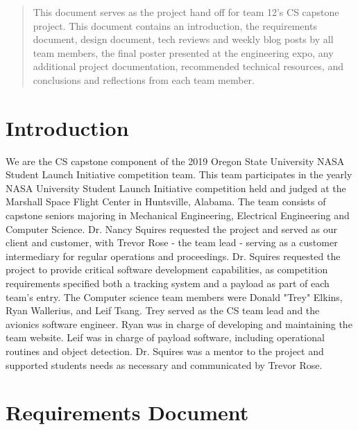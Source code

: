 \documentclass[onecolumn, draftclsnofoot, 10pt, compsoc]{IEEEtran}
\begin{document}
\begin{titlepage}
    \begin{abstract}
        This document serves as the project hand off for team 12's CS capstone project. This document contains an introduction, the requirements document, design document, tech reviews and weekly blog posts by all team members, the final poster presented at the engineering expo, any additional project documentation, recommended technical resources, and conclusions and reflections from each team member.
	\end{abstract}
\end{titlepage}
\newpage

\tableofcontents
\clearpage

\section{Introduction}
We are the CS capstone component of the 2019 Oregon State University NASA Student Launch Initiative competition team. This team participates in the yearly NASA University Student Launch Initiative competition held and judged at the Marshall Space Flight Center in Huntsville, Alabama. The team consists of capstone seniors majoring in Mechanical Engineering, Electrical Engineering and Computer Science. Dr. Nancy Squires requested the project and served as our client and customer, with Trevor Rose - the team lead - serving as a customer intermediary for regular operations and proceedings. Dr. Squires requested the project to provide critical software development capabilities, as competition requirements specified both a tracking system and a payload as part of each team's entry. The Computer science team members were Donald "Trey" Elkins, Ryan Wallerius, and Leif Tsang. Trey served as the CS team lead and the avionics software engineer. Ryan was in charge of developing and maintaining the team website. Leif was in charge of payload software, including operational routines and object detection. Dr. Squires was a mentor to the project and supported students needs as necessary and communicated by Trevor Rose.


\section{Requirements Document}
\end{document}
